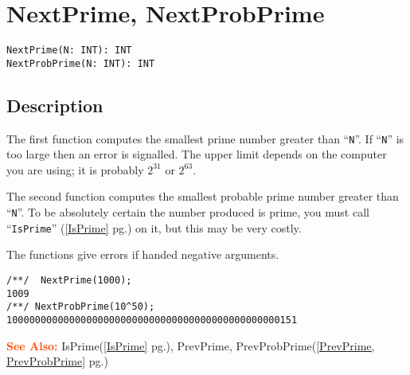 \documentclass[a4paper]{mybook}
\newenvironment{command}{}{} %
\newcommand\SeeAlso{\par\textcolor{OrangeRed}{\textbf{\large See Also: }}}
\begin{document}
\section{NextPrime, NextProbPrime}
\label{NextPrime, NextProbPrime}
\begin{command} %


\begin{Verbatim}[label=syntax, rulecolor=\color{MidnightBlue},
frame=single]
NextPrime(N: INT): INT
NextProbPrime(N: INT): INT
\end{Verbatim}


\subsection*{Description}

The first function computes the smallest prime number greater than ``\verb&N&''.
If ``\verb&N&'' is too large then an error is signalled.  The upper
limit depends on the computer you are using; it is probably $2^31$
or $2^63$.
\par 
The second function computes the smallest probable prime number greater than ``\verb&N&''.  
To be absolutely certain the number produced is prime,
you must call ``\verb&IsPrime&'' (\ref{IsPrime} pg.\pageref{IsPrime}) on it, but this may be very costly.
\par 
The functions give errors if handed negative arguments.
\begin{Verbatim}[label=example, rulecolor=\color{PineGreen}, frame=single]
/**/  NextPrime(1000);
1009
/**/ NextProbPrime(10^50);
100000000000000000000000000000000000000000000000151
\end{Verbatim}


\SeeAlso %
  IsPrime(\ref{IsPrime} pg.\pageref{IsPrime}), 
    PrevPrime, PrevProbPrime(\ref{PrevPrime, PrevProbPrime} pg.\pageref{PrevPrime, PrevProbPrime})
\end{command} %
\end{document}
